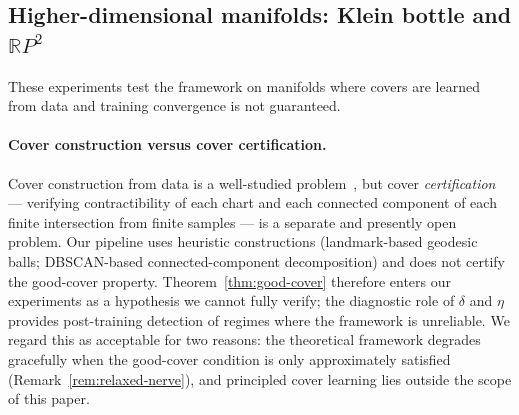 \documentclass[11pt]{article}
\theoremstyle{plain}
\theoremstyle{definition}
\theoremstyle{remark}
\begin{document}
\subsection{Higher-dimensional manifolds: Klein bottle and $\mathbb{R}P^2$}\label{sec:exp-higher-dim}

These experiments test the framework on manifolds where covers are learned from data and training convergence is not guaranteed. 

\paragraph{Cover construction versus cover certification.}
Cover construction from data is a well-studied problem~\cite{singhMC07,scoccola2025coverlearninglargescaletopology}, but cover \emph{certification} — verifying contractibility of each chart and each connected component of each finite intersection from finite samples — is a separate and presently open problem. Our pipeline uses heuristic constructions (landmark-based geodesic balls; DBSCAN-based connected-component decomposition) and does not certify the good-cover property. Theorem~\ref{thm:good-cover} therefore enters our experiments as a hypothesis we cannot fully verify; the diagnostic role of $\delta$ and $\eta$ provides post-training detection of regimes where the framework is unreliable. We regard this as acceptable for two reasons: the theoretical framework degrades gracefully when the good-cover condition is only approximately satisfied (Remark~\ref{rem:relaxed-nerve}), and principled cover learning lies outside the scope of this paper. 
\end{document}
